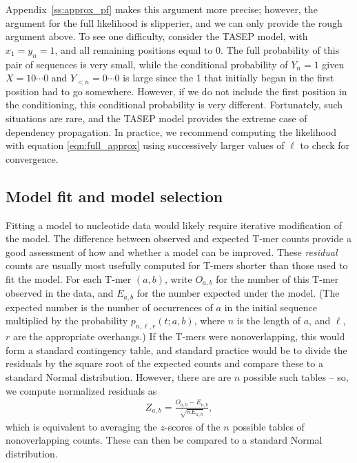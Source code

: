 \documentclass{article}
\theoremstyle{plain}
\theoremstyle{definition}
\begin{document}
Appendix~\ref{ss:approx_pf} makes this argument more precise;
however, the argument for the full likelihood is slipperier,
and we can only provide the rough argument above.
To see one difficulty, consider the TASEP model,
with $x_1 = y_n = 1$, and all remaining positions equal to 0.
The full probability of this pair of sequences is very small,
while the conditional probability of $Y_n=1$ given $X=10\cdots0$ and $Y_{<n} = 0\cdots0$
is large since the 1 that initially began in the first position
had to go somewhere.
However, if we do not include the first position in the conditioning,
this conditional probability is very different.
Fortunately, such situations are rare,
and the TASEP model provides the extreme case of dependency propagation.
In practice, we recommend computing the likelihood with equation \eqref{eqn:full_approx}
using successively larger values of $\ell$
to check for convergence.


\subsection{Model fit and model selection}

Fitting a model to nucleotide data would likely require iterative modification of the model.
The difference between observed and expected T-mer counts provide a good assessment of how and whether a model can be improved.
These \emph{residual} counts are usually most usefully computed for T-mers shorter than those used to fit the model.
For each T-mer $(a,b)$, write $O_{a,b}$ for the number of this T-mer observed in the data,
and $E_{a,b}$ for the number expected under the model.
(The expected number is the number of occurrences of $a$ in the initial sequence
multiplied by the probability $p_{n,\ell,r}(t;a,b)$, where $n$ is the length of $a$,
and $\ell$, $r$ are the appropriate overhangs.)
If the T-mers were nonoverlapping, this would form a standard contingency table,
and standard practice would be to divide the residuals by the square root of the expected counts
and compare these to a standard Normal distribution.
However, there are are $n$ possible such tables --
so, we compute normalized residuals as
\begin{align}
    Z_{a,b} = \frac{ O_{a,b} - E_{a,b} }{ \sqrt{n E_{a,b}} },
\end{align}
which is equivalent to averaging the $z$-scores of the $n$ possible tables of nonoverlapping counts.
These can then be compared to a standard Normal distribution.
\end{document}
